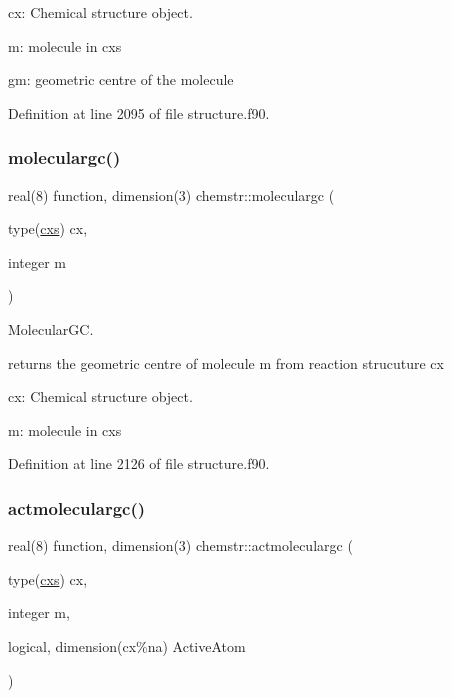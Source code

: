 \begin{DoxyItemize}
\item cx\+: Chemical structure object.
\item m\+: molecule in cxs
\item gm\+: geometric centre of the molecule 
\end{DoxyItemize}

Definition at line 2095 of file structure.\+f90.

\mbox{\label{namespacechemstr_af0c4a9bb408a073e444be223a565e7cc}} 
\subsubsection{\texorpdfstring{moleculargc()}{moleculargc()}}
{\footnotesize\ttfamily real(8) function, dimension(3) chemstr\+::moleculargc (\begin{DoxyParamCaption}\item[{type(\mbox{\hyperlink{structchemstr_1_1cxs}{cxs}})}]{cx,  }\item[{integer}]{m }\end{DoxyParamCaption})}



Molecular\+GC. 

returns the geometric centre of molecule m from reaction strucuture cx


\begin{DoxyItemize}
\item cx\+: Chemical structure object.
\item m\+: molecule in cxs 
\end{DoxyItemize}

Definition at line 2126 of file structure.\+f90.

\mbox{\label{namespacechemstr_a521f25a0628d92de9b89145bcd9fd1d5}} 
\subsubsection{\texorpdfstring{actmoleculargc()}{actmoleculargc()}}
{\footnotesize\ttfamily real(8) function, dimension(3) chemstr\+::actmoleculargc (\begin{DoxyParamCaption}\item[{type(\mbox{\hyperlink{structchemstr_1_1cxs}{cxs}})}]{cx,  }\item[{integer}]{m,  }\item[{logical, dimension(cx\%na)}]{Active\+Atom }\end{DoxyParamCaption})}



